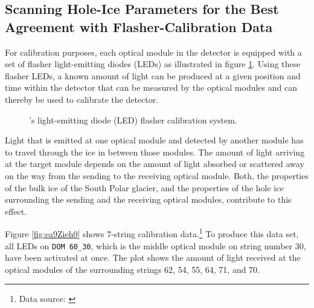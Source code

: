 
\subsection{Scanning Hole-Ice Parameters for the Best Agreement with Flasher-Calibration Data}
\label{sec:flasher}


For calibration purposes, each optical module in the \icecube detector is equipped with a set of flasher light-emitting diodes (LEDs) as illustrated in figure \ref{fig:Quee3yui}. Using these flasher LEDs, a known amount of light can be produced at a given position and time within the detector that can be measured by the optical modules and can thereby be used to calibrate the detector. \cite{icepaper}

\begin{figure}[htbp]
  \hfill
  \caption{\icecube's light-emitting diode (LED) flasher calibration system.}
  \label{fig:Quee3yui}
\end{figure}

Light that is emitted at one optical module and detected by another module has to travel through the ice in between those modules. The amount of light arriving at the target module depends on the amount of light absorbed or scattered away on the way from the sending to the receiving optical module. Both, the properties of the bulk ice of the South Polar glacier, and the properties of the hole ice surrounding the sending and the receiving optical modules, contribute to this effect.

Figure \ref{fig:ea9Zieh0} shows 7-string calibration data.\footnote{Data source: \cite{flasherdata}} To produce this data set, all LEDs on \texttt{DOM 60\_30}, which is the middle optical module on string number 30, have been activated at once. The plot shows the amount of light received at the optical modules of the surrounding strings 62, 54, 55, 64, 71, and 70.

